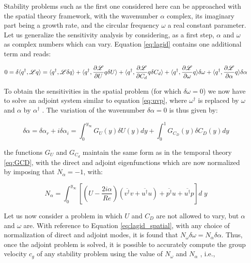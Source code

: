 Stability problems such as the first one considered here can be approached with the
spatial theory framework, with the wavenumber $\alpha$ complex, its imaginary part being a growth rate,
and the circular frequency $\omega$ a real constant parameter. Let us generalize the sensitivity analysis by
considering, as a first step, $\alpha$ and $\omega$ as complex numbers which can vary. Equation \eqref{eq:lagid} contains one
additional term and reads:

\begin{equation}
0 = \delta \langle q^{\dagger}, \mathscr{L} q \rangle = 
\langle q^{\dagger}, \mathscr{L} \delta q \rangle +
\langle q^{\dagger}, \dfrac{\partial \mathscr{L}}{\partial U}  q \delta U\rangle +
\langle q^{\dagger}, \dfrac{\partial \mathscr{L}}{\partial C_d}  q \delta C_d\rangle +
\langle q^{\dagger}, \dfrac{\partial \mathscr{L}}{\partial \omega}  q \rangle \delta \omega +
\langle q^{\dagger}, \dfrac{\partial \mathscr{L}}{\partial \alpha}  q \rangle \delta \alpha
\label{eq:lagid_spatial}
\end{equation}

To obtain the sensitivities in the spatial problem (for which $\delta \omega = 0$) we now have to solve an adjoint
system similar to equation \eqref{eq:uvp}, where $\omega^{\dagger}$ is replaced by $\omega$ and $\alpha$ by $\alpha^{\dagger}$ . The variation of the wavenumber  $\delta \alpha = 0$ is thus given by:

$$
\delta \alpha =\delta \alpha_r + i \delta \alpha_i= \int_0^{y_{\infty}}  G_U(y) \delta U(y) dy + \int_0^{1}  G_{C_D}(y) \delta C_D(y) dy
$$

the functions $G_U$ and $G_{C_d}$ maintain the same form as in the temporal theory \eqref{eq:GCD}, with the direct and
adjoint eigenfunctions which are now normalized by imposing that $N_{\alpha} = -1$, with:

$$
N_{\alpha} = \int_0^{y_{\infty}} \left[ \left(U - \dfrac{2i\alpha}{Re}\right) ( \overline{ v^{\dagger}} v +  \overline{ u^{\dagger}} u  )   +  \overline{ p^{\dagger}} u +  \overline{ u^{\dagger}} p  \right] d \; y
$$

Let us now consider a problem in which $U$ and $C_D$ are not allowed to vary, but $\alpha$ and $\omega$ are.
With reference to Equation \eqref{eq:lagid_spatial}, with any choice of normalization of direct and adjoint modes, it
is found that $ N_{\omega} \delta \omega = N_{\alpha} \delta \alpha $. Thus, once the adjoint problem is solved, it is possible to accurately
compute the group velocity $c_g$ of any stability problem using the value of $ N_{\omega}$ and $ N_{\alpha}$ , i.e.,

